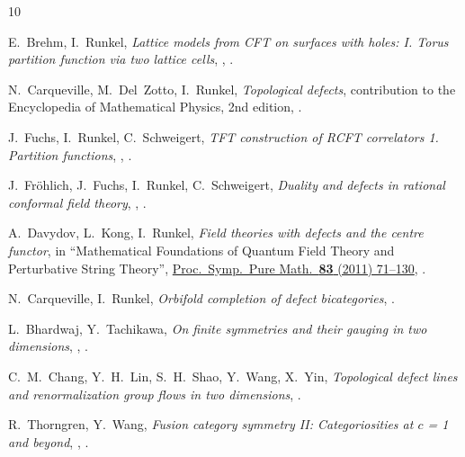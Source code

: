 \documentclass[11pt,a4paper]{article}
\numberwithin{equation}{section}
\begin{document}
\begin{thebibliography}{10}

E.~Brehm, I.~Runkel,
\textit{Lattice models from CFT on surfaces with holes: I. Torus partition function via two lattice cells},
,
.

N.~Carqueville, M.~Del~Zotto, I.~Runkel,
\textit{Topological defects},
contribution to the Encyclopedia of Mathematical Physics, 2nd edition,
.

J.~Fuchs, I.~Runkel, C.~Schweigert,
{\it TFT construction of RCFT correlators 1. Partition functions},
,
.

J.~Fr\"ohlich, J.~Fuchs, I.~Runkel, C.~Schweigert,
\textit{Duality and defects in rational conformal field theory},
,
.

A.~Davydov, L.~Kong, I.~Runkel, 
\textit{Field theories with defects and the centre functor}, 
in ``Mathematical Foundations of Quantum Field Theory and Perturbative String Theory'',
\href{https://bookstore.ams.org/pspum-83/}{Proc.\ Symp.\ Pure Math.\ \textbf{83} (2011) 71--130}, . 

N.~Carqueville, I.~Runkel,
\textit{Orbifold completion of defect bicategories},
.

L.~Bhardwaj, Y.~Tachikawa,
\textit{On finite symmetries and their gauging in two dimensions},
,
.

C.~M.~Chang, Y.~H.~Lin, S.~H.~Shao, Y.~Wang, X.~Yin,
\textit{Topological defect lines and renormalization group flows in two dimensions},
.

R.~Thorngren, Y.~Wang,
\textit{Fusion category symmetry II: Categoriosities at $c$ = 1 and beyond},
,
.


\end{thebibliography}
\end{document}
